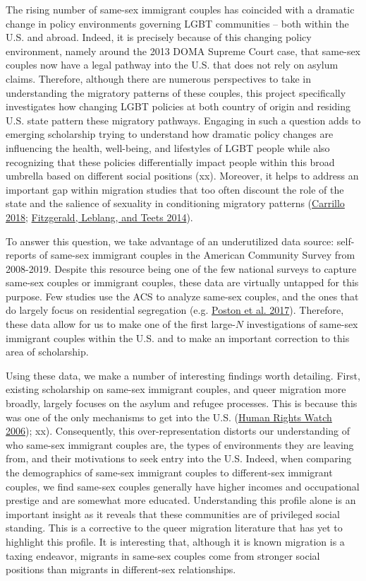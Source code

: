 \documentclass[
  11pt,
]{article}
\begin{document}
The rising number of same-sex immigrant couples has coincided with a dramatic change in policy environments governing LGBT communities -- both within the U.S. and abroad. Indeed, it is precisely because of this changing policy environment, namely around the 2013 DOMA Supreme Court case, that same-sex couples now have a legal pathway into the U.S. that does not rely on asylum claims. Therefore, although there are numerous perspectives to take in understanding the migratory patterns of these couples, this project specifically investigates how changing LGBT policies at both country of origin and residing U.S. state pattern these migratory pathways. Engaging in such a question adds to emerging scholarship trying to understand how dramatic policy changes are influencing the health, well-being, and lifestyles of LGBT people while also recognizing that these policies differentially impact people within this broad umbrella based on different social positions (xx). Moreover, it helps to address an important gap within migration studies that too often discount the role of the state and the salience of sexuality in conditioning migratory patterns (\protect\hyperlink{ref-carrillo_2018}{Carrillo 2018}; \protect\hyperlink{ref-fitzgerald_2014}{Fitzgerald, Leblang, and Teets 2014}).

To answer this question, we take advantage of an underutilized data source: self-reports of same-sex immigrant couples in the American Community Survey from 2008-2019. Despite this resource being one of the few national surveys to capture same-sex couples or immigrant couples, these data are virtually untapped for this purpose. Few studies use the ACS to analyze same-sex couples, and the ones that do largely focus on residential segregation (e.g. \protect\hyperlink{ref-poston_2017}{Poston et al. 2017}). Therefore, these data allow for us to make one of the first large-\(N\) investigations of same-sex immigrant couples within the U.S. and to make an important correction to this area of scholarship.

Using these data, we make a number of interesting findings worth detailing. First, existing scholarship on same-sex immigrant couples, and queer migration more broadly, largely focuses on the asylum and refugee processes. This is because this was one of the only mechanisms to get into the U.S. (\protect\hyperlink{ref-humanrightswatch_2006}{Human Rights Watch 2006}); xx). Consequently, this over-representation distorts our understanding of who same-sex immigrant couples are, the types of environments they are leaving from, and their motivations to seek entry into the U.S. Indeed, when comparing the demographics of same-sex immigrant couples to different-sex immigrant couples, we find same-sex couples generally have higher incomes and occupational prestige and are somewhat more educated. Understanding this profile alone is an important insight as it reveals that these communities are of privileged social standing. This is a corrective to the queer migration literature that has yet to highlight this profile. It is interesting that, although it is known migration is a taxing endeavor, migrants in same-sex couples come from stronger social positions than migrants in different-sex relationships.
\end{document}
